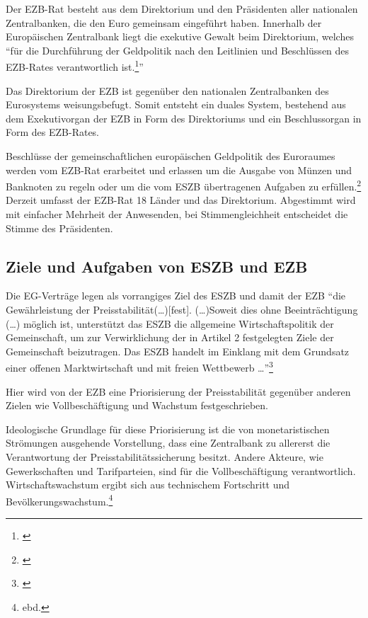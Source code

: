 \documentclass[
        onecolumn,
        a4paper,
        abstracton,
        parskip=half
        ,final
        ]{scrartcl}
\begin{document}
Der EZB-Rat besteht aus dem Direktorium und den Pr{\"a}sidenten aller nationalen Zentralbanken, die den Euro gemeinsam eingef{\"u}hrt haben. Innerhalb der Europ{\"a}ischen Zentralbank liegt die exekutive Gewalt beim Direktorium, welches "`f{\"u}r die Durchf{\"u}hrung der Geldpolitik nach den Leitlinien und Beschl{\"u}ssen des EZB-Rates verantwortlich ist.\footnote[47]{\citep*[S.553]{Basseler2010}}"'

Das Direktorium der \ac{EZB} ist gegen{\"u}ber den nationalen Zentralbanken des Eurosystems weisungsbefugt. Somit entsteht ein duales System, bestehend aus dem Exekutivorgan der EZB in Form des Direktoriums und ein Beschlussorgan in Form des EZB-Rates.

Beschl{\"u}sse der gemeinschaftlichen europ{\"a}ischen Geldpolitik des Euroraumes werden vom EZB-Rat erarbeitet und erlassen um die Ausgabe von M{\"u}nzen und Banknoten zu regeln oder um die vom \ac{ESZB} {\"u}bertragenen Aufgaben zu erf{\"u}llen.\footnote[100]{\citep*[vgl.][S.553]{Basseler2010}}
Derzeit umfasst der EZB-Rat 18 L{\"a}nder und das Direktorium. Abgestimmt wird mit einfacher Mehrheit der Anwesenden, bei Stimmengleichheit entscheidet die Stimme des Pr{\"a}sidenten.


\subsection{Ziele und Aufgaben von ESZB und EZB}  %
Die EG-Vertr{\"a}ge legen als vorrangiges Ziel des \ac{ESZB} und damit der EZB "`die Gew{\"a}hrleistung der Preisstabilit{\"a}t(\ldots)[fest]. (\ldots)Soweit dies ohne Beeintr{\"a}chtigung  (\ldots) m{\"o}glich ist, unterst{\"u}tzt das ESZB die allgemeine Wirtschaftspolitik der Gemeinschaft, um zur Verwirklichung der in Artikel 2 festgelegten Ziele der Gemeinschaft beizutragen. Das ESZB handelt im Einklang mit dem Grundsatz einer offenen Marktwirtschaft und mit freien Wettbewerb \ldots"'\footnote[48]{\citep*[vgl.][S.554]{Basseler2010}}

Hier wird von der EZB eine Priorisierung der Preisstabilit{\"a}t gegen{\"u}ber anderen Zielen wie Vollbesch{\"a}ftigung und Wachstum festgeschrieben.

Ideologische Grundlage f{\"u}r diese Priorisierung ist die von monetaristischen Str{\"o}mungen ausgehende Vorstellung, dass eine Zentralbank zu allererst die Verantwortung der Preisstabilit{\"a}tssicherung besitzt. Andere Akteure, wie Gewerkschaften und Tarifparteien, sind f{\"u}r die Vollbesch{\"a}ftigung verantwortlich. Wirtschaftswachstum ergibt sich aus technischem Fortschritt und Bev{\"o}lkerungswachstum.\footnote[50]{ebd.}
\end{document}
